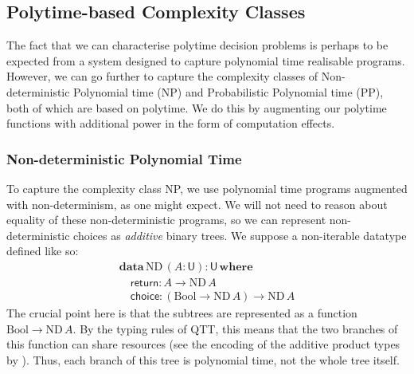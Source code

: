 \documentclass[acmsmall,screen]{acmart}
\newcommand{\BoolTy}{\mathrm{Bool}}
\begin{document}
\subsection{Polytime-based Complexity Classes}

The fact that we can characterise polytime decision problems is
perhaps to be expected from a system designed to capture polynomial
time realisable programs. However, we can go further to capture the
complexity classes of Non-deterministic Polynomial time (NP) and
Probabilistic Polynomial time (PP), both of which are based on
polytime. We do this by augmenting our polytime functions with
additional power in the form of computation effects.

\subsubsection{Non-deterministic Polynomial Time}
\label{sec:np-class}

To capture the complexity class NP, we use polynomial time programs
augmented with non-determinism, as one might expect. We will not need
to reason about equality of these non-deterministic programs, so we
can represent non-deterministic choices as \emph{additive} binary
trees. We suppose a non-iterable datatype defined like so:
\begin{displaymath}
  \begin{array}{l}
    \textbf{data}\,\mathrm{ND}\,(A : \mathsf{U}) : \mathsf{U}\,\textbf{where} \\
    \quad \mathsf{return} : A \to \mathrm{ND}\,A \\
    \quad \mathsf{choice} : (\BoolTy \to \mathrm{ND}\,A) \to \mathrm{ND}\,A
  \end{array}
\end{displaymath}
The crucial point here is that the subtrees are represented as a
function $\BoolTy \to \mathrm{ND}\,A$. By the typing rules of QTT,
this means that the two branches of this function can share resources
(see the encoding of the additive product types by
\citet{atkey18qtt}). Thus, each branch of this tree is polynomial
time, not the whole tree itself.
\end{document}
